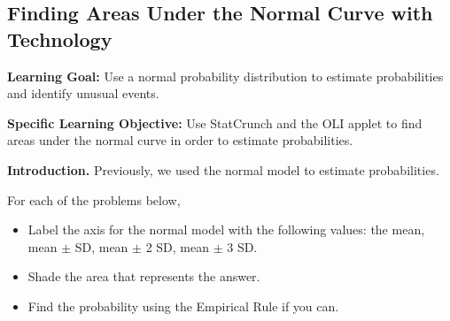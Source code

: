 \cleardoublepage
\subsection{Finding Areas Under the Normal Curve with Technology}
\textbf{Learning Goal:} Use a normal probability distribution to estimate probabilities and identify unusual events.

\textbf{Specific Learning Objective:} Use StatCrunch and the OLI applet to find areas under the normal curve in order to estimate probabilities.

\textbf{Introduction.} Previously, we used the normal model to estimate probabilities.

For each of the problems below,
\begin{itemize}
\item Label the axis for the normal model with the following values: the mean, mean $\pm$ SD, mean $\pm$ 2 SD, mean $\pm$ 3 SD.
\item Shade the area that represents the answer.
\item Find the probability using the Empirical Rule if you can.
\end{itemize}

